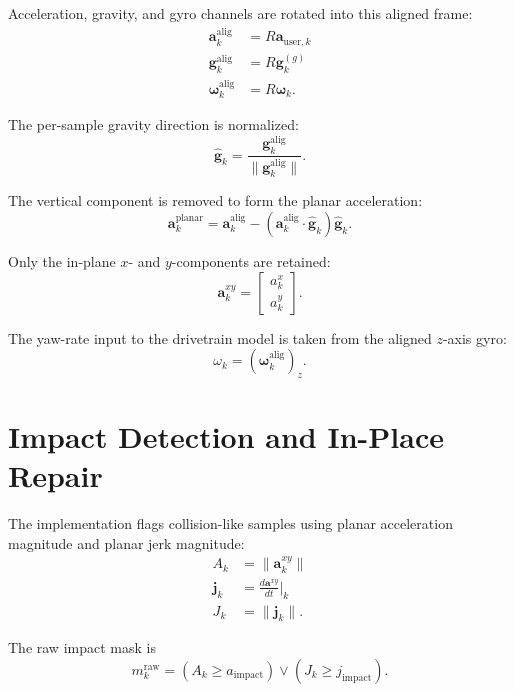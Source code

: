 \documentclass[11pt]{article}
\begin{document}
Acceleration, gravity, and gyro channels are rotated into this aligned frame:
\begin{align}
\bm{a}^{\mathrm{alig}}_k &= R \bm{a}_{\mathrm{user},k} \\
\bm{g}^{\mathrm{alig}}_k &= R \bm{g}^{(g)}_k \\
\bm{\omega}^{\mathrm{alig}}_k &= R \bm{\omega}_k.
\end{align}

The per-sample gravity direction is normalized:
\begin{equation}
\hat{\bm{g}}_k = \frac{\bm{g}^{\mathrm{alig}}_k}{\|\bm{g}^{\mathrm{alig}}_k\|}.
\end{equation}

The vertical component is removed to form the planar acceleration:
\begin{equation}
\bm{a}^{\mathrm{planar}}_k
=
\bm{a}^{\mathrm{alig}}_k
- \left( \bm{a}^{\mathrm{alig}}_k \cdot \hat{\bm{g}}_k \right)\hat{\bm{g}}_k.
\end{equation}

Only the in-plane \(x\)- and \(y\)-components are retained:
\begin{equation}
\bm{a}^{xy}_k =
\begin{bmatrix}
a^x_k \\
a^y_k
\end{bmatrix}.
\end{equation}

The yaw-rate input to the drivetrain model is taken from the aligned \(z\)-axis gyro:
\begin{equation}
\omega_k = \left( \bm{\omega}^{\mathrm{alig}}_k \right)_z.
\end{equation}

\section{Impact Detection and In-Place Repair}
The implementation flags collision-like samples using planar acceleration magnitude and planar jerk magnitude:
\begin{align}
A_k &= \|\bm{a}^{xy}_k\| \\
\bm{j}_k &= \frac{d\bm{a}^{xy}}{dt}\Big|_k \\
J_k &= \|\bm{j}_k\|.
\end{align}

The raw impact mask is
\begin{equation}
m_k^{\mathrm{raw}}
=
\left(A_k \ge a_{\mathrm{impact}}\right)
\lor
\left(J_k \ge j_{\mathrm{impact}}\right).
\end{equation}
\end{document}
